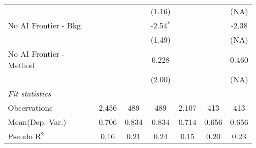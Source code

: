 \begin{tabular}{lcccccc}
                           &              &         & (1.16)        &              &        & (NA)\\   
   No AI Frontier - Bkg.   &              &         & -2.54$^{*}$   &              &        & -2.38\\   
                           &              &         & (1.49)        &              &        & (NA)\\   
   No AI Frontier - Method &              &         & 0.228         &              &        & 0.460\\   
                           &              &         & (2.00)        &              &        & (NA)\\   
   \midrule
   \emph{Fit statistics}\\
   Observations            & 2,456        & 489     & 489           & 2,107        & 413    & 413\\  
Mean(Dep. Var.) & 0.706 & 0.834 & 0.834 & 0.714 & 0.656 & 0.656 \\
   Pseudo R$^2$            & 0.16         & 0.21    & 0.24          & 0.15         & 0.20   & 0.23\\  
   

\end{tabular}
